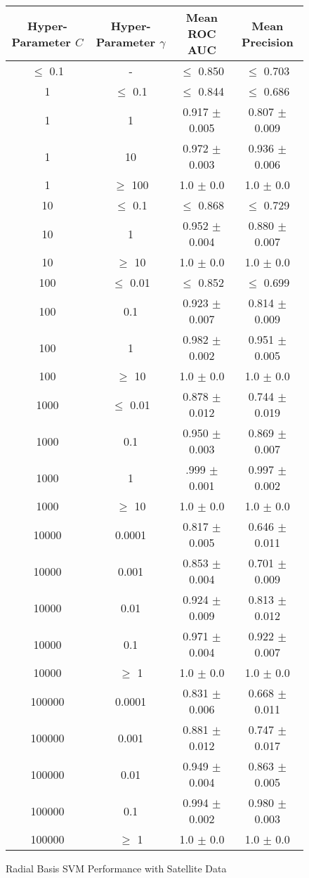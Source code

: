 \documentclass[tikz]{article}
\begin{document}
\begin{figure}[H]
\centering
\begin{tabular}{|c|c|c|c|}
\hline
Hyper-Parameter $C$ & Hyper-Parameter $\gamma$ & Mean ROC AUC & Mean Precision \\
\hline
$\leq$ 0.1 & - & $\leq$ 0.850 & $\leq$ 0.703 \\
\hline
1 & $\leq$ 0.1 & $\leq$ 0.844 & $\leq$ 0.686 \\
\hline
1 & 1 & 0.917 $\pm$ 0.005 & 0.807 $\pm$ 0.009 \\
\hline
1 & 10 & 0.972 $\pm$ 0.003 & 0.936 $\pm$ 0.006 \\
\hline
1 & $\geq$ 100 & 1.0 $\pm$ 0.0 & 1.0 $\pm$ 0.0 \\
\hline
10 & $\leq$ 0.1 & $\leq$ 0.868 & $\leq$ 0.729 \\
\hline
10 & 1 & 0.952 $\pm$ 0.004 & 0.880 $\pm$ 0.007 \\
\hline
10 & $\geq$ 10 & 1.0 $\pm$ 0.0 & 1.0 $\pm$ 0.0 \\
\hline
100 & $\leq$ 0.01 & $\leq$ 0.852 & $\leq$ 0.699 \\
\hline
100 & 0.1 & 0.923 $\pm$ 0.007 & 0.814 $\pm$ 0.009 \\
\hline
100 & 1 & 0.982 $\pm$ 0.002 & 0.951 $\pm$ 0.005 \\
\hline
100 & $\geq$ 10 & 1.0 $\pm$ 0.0 & 1.0 $\pm$ 0.0 \\
\hline
1000 & $\leq$ 0.01 & 0.878 $\pm$ 0.012 & 0.744 $\pm$ 0.019 \\
\hline
1000 & 0.1 & 0.950 $\pm$ 0.003 & 0.869 $\pm$ 0.007 \\
\hline
1000 & 1 & .999 $\pm$ 0.001 & 0.997 $\pm$ 0.002 \\
\hline
1000 & $\geq$ 10 & 1.0 $\pm$ 0.0 & 1.0 $\pm$ 0.0 \\
\hline
10000 & 0.0001 & 0.817 $\pm$ 0.005 & 0.646 $\pm$ 0.011 \\
\hline
10000 & 0.001 & 0.853 $\pm$ 0.004 & 0.701 $\pm$ 0.009 \\
\hline
10000 & 0.01 & 0.924 $\pm$ 0.009 & 0.813 $\pm$ 0.012 \\
\hline
10000 & 0.1 & 0.971 $\pm$ 0.004 & 0.922 $\pm$ 0.007 \\
\hline
10000 & $\geq$ 1 & 1.0 $\pm$ 0.0 & 1.0 $\pm$ 0.0 \\
\hline
100000 & 0.0001 & 0.831 $\pm$ 0.006 & 0.668 $\pm$ 0.011 \\
\hline
100000 & 0.001 & 0.881 $\pm$ 0.012 & 0.747 $\pm$ 0.017 \\
\hline
100000 & 0.01 & 0.949 $\pm$ 0.004 & 0.863 $\pm$ 0.005 \\
\hline
100000 & 0.1 & 0.994 $\pm$ 0.002 & 0.980 $\pm$ 0.003 \\
\hline
100000 & $\geq$ 1 & 1.0 $\pm$ 0.0 & 1.0 $\pm$ 0.0 \\
\hline
\end{tabular}
\caption{Radial Basis SVM Performance with Satellite Data}
\label{fig:sat_rbf_1}
\end{figure}
\end{document}
